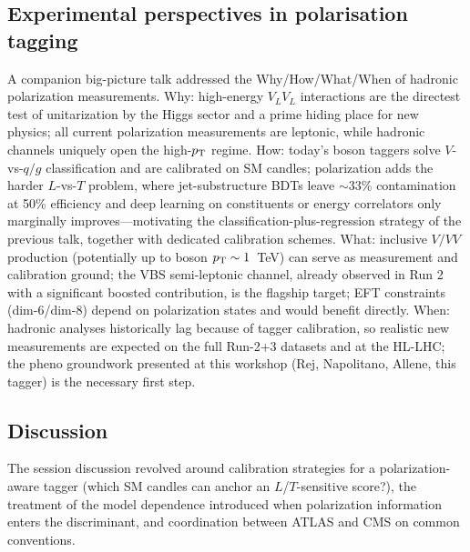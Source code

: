 \subsection{Experimental perspectives in polarisation tagging}
A companion big-picture talk addressed the Why/How/What/When of hadronic
polarization measurements. Why: high-energy $V_LV_L$ interactions are the
directest test of unitarization by the Higgs sector and a prime hiding place
for new physics; all current polarization measurements are leptonic, while
hadronic channels uniquely open the high-$p_{\mathrm{T}}$ regime. How: today's boson
taggers solve $V$-vs-$q/g$ classification and are calibrated on SM candles;
polarization adds the harder $L$-vs-$T$ problem, where jet-substructure BDTs
leave $\sim$33\% contamination at 50\% efficiency and deep learning on
constituents or energy correlators only marginally improves---motivating the
classification-plus-regression strategy of the previous talk, together with
dedicated calibration schemes. What: inclusive $V/VV$ production (potentially
up to boson $p_{\mathrm{T}}\sim1$~TeV) can serve as measurement and calibration ground;
the VBS semi-leptonic channel, already observed in Run 2 with a significant
boosted contribution, is the flagship target; EFT constraints (dim-6/dim-8)
depend on polarization states and would benefit directly. When: hadronic
analyses historically lag because of tagger calibration, so realistic new
measurements are expected on the full Run-2+3 datasets and at the HL-LHC;
the pheno groundwork presented at this workshop (Rej, Napolitano, Allene,
this tagger) is the necessary first step.

\subsection{Discussion}
The session discussion revolved around calibration strategies for a
polarization-aware tagger (which SM candles can anchor an $L$/$T$-sensitive
score?), the treatment of the model dependence introduced when polarization
information enters the discriminant, and coordination between ATLAS and CMS on
common conventions.
